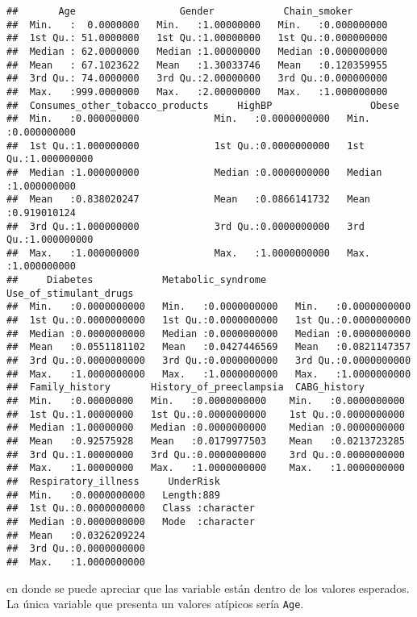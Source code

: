 \documentclass[
  10pt,
  spanish,
]{article}
\begin{document}
\begin{verbatim}
##       Age                  Gender            Chain_smoker        
##  Min.   :  0.0000000   Min.   :1.00000000   Min.   :0.000000000  
##  1st Qu.: 51.0000000   1st Qu.:1.00000000   1st Qu.:0.000000000  
##  Median : 62.0000000   Median :1.00000000   Median :0.000000000  
##  Mean   : 67.1023622   Mean   :1.30033746   Mean   :0.120359955  
##  3rd Qu.: 74.0000000   3rd Qu.:2.00000000   3rd Qu.:0.000000000  
##  Max.   :999.0000000   Max.   :2.00000000   Max.   :1.000000000  
##  Consumes_other_tobacco_products     HighBP                 Obese            
##  Min.   :0.000000000             Min.   :0.0000000000   Min.   :0.000000000  
##  1st Qu.:1.000000000             1st Qu.:0.0000000000   1st Qu.:1.000000000  
##  Median :1.000000000             Median :0.0000000000   Median :1.000000000  
##  Mean   :0.838020247             Mean   :0.0866141732   Mean   :0.919010124  
##  3rd Qu.:1.000000000             3rd Qu.:0.0000000000   3rd Qu.:1.000000000  
##  Max.   :1.000000000             Max.   :1.0000000000   Max.   :1.000000000  
##     Diabetes            Metabolic_syndrome     Use_of_stimulant_drugs
##  Min.   :0.0000000000   Min.   :0.0000000000   Min.   :0.0000000000  
##  1st Qu.:0.0000000000   1st Qu.:0.0000000000   1st Qu.:0.0000000000  
##  Median :0.0000000000   Median :0.0000000000   Median :0.0000000000  
##  Mean   :0.0551181102   Mean   :0.0427446569   Mean   :0.0821147357  
##  3rd Qu.:0.0000000000   3rd Qu.:0.0000000000   3rd Qu.:0.0000000000  
##  Max.   :1.0000000000   Max.   :1.0000000000   Max.   :1.0000000000  
##  Family_history       History_of_preeclampsia  CABG_history         
##  Min.   :0.00000000   Min.   :0.0000000000    Min.   :0.0000000000  
##  1st Qu.:1.00000000   1st Qu.:0.0000000000    1st Qu.:0.0000000000  
##  Median :1.00000000   Median :0.0000000000    Median :0.0000000000  
##  Mean   :0.92575928   Mean   :0.0179977503    Mean   :0.0213723285  
##  3rd Qu.:1.00000000   3rd Qu.:0.0000000000    3rd Qu.:0.0000000000  
##  Max.   :1.00000000   Max.   :1.0000000000    Max.   :1.0000000000  
##  Respiratory_illness     UnderRisk        
##  Min.   :0.0000000000   Length:889        
##  1st Qu.:0.0000000000   Class :character  
##  Median :0.0000000000   Mode  :character  
##  Mean   :0.0326209224                     
##  3rd Qu.:0.0000000000                     
##  Max.   :1.0000000000
\end{verbatim}

en donde se puede apreciar que las variable están dentro de los valores
esperados. La única variable que presenta un valores atípicos sería
\texttt{Age}.
\end{document}
